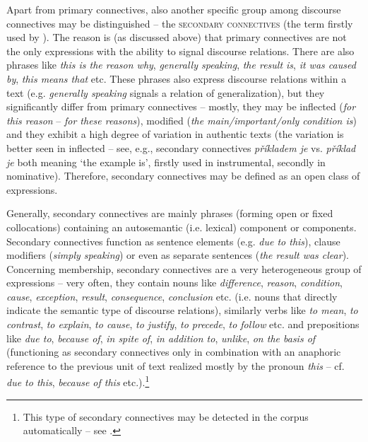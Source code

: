 \documentclass[output=paper]{langsci/langscibook.cls}
\begin{document}
Apart from primary connectives, also another specific group among discourse connectives may be distinguished – the \textsc{secondary connectives} (the term firstly used by \citealt{biblio:RyRyCentreand2014}). The reason is (as discussed above) that primary connectives are not the only expressions with the ability to signal discourse relations. There are also  phrases like \textit{this is the reason why}, \textit{generally speaking}, \textit{the result is}, \textit{it was caused by}, \textit{this means that} etc. These phrases also express discourse relations within a text (e.g. \textit{generally speaking} signals a relation of generalization), but they significantly differ from primary connectives – mostly, they may be inflected (\textit{for this reason} – \textit{for these reasons}), modified (\textit{the main/important/only condition is}) and they exhibit a high degree of variation in authentic texts (the variation is better seen in inflected  – see, e.g., secondary connectives \textit{příkladem je} vs. \textit{příklad je} both meaning `the example is', firstly used in instrumental, secondly in nominative). Therefore, secondary connectives may be defined as an open class of expressions. 


Generally, secondary connectives are mainly  phrases (forming open or fixed collocations) containing an autosemantic (i.e. lexical) component or components. Secondary connectives function as sentence elements (e.g. \textit{due to this}), clause modifiers (\textit{simply speaking}) or even as separate sentences (\textit{the result was clear}). Concerning  membership, secondary connectives are a very heterogeneous group of expressions – very often, they contain nouns like \textit{difference}, \textit{reason}, \textit{condition}, \textit{cause}, \textit{exception}, \textit{result}, \textit{consequence}, \textit{conclusion} etc. (i.e. nouns that directly indicate the semantic type of discourse relations), similarly verbs like \textit{to mean}, \textit{to contrast}, \textit{to explain}, \textit{to cause}, \textit{to justify}, \textit{to precede}, \textit{to follow} etc. and prepositions like \textit{due to}, \textit{because of}, \textit{in spite of}, \textit{in addition to}, \textit{unlike}, \textit{on the basis of} (functioning as secondary connectives only in combination with an anaphoric reference to the previous unit of text realized mostly by the pronoun \textit{this }– cf. \textit{due to this}, \textit{because of this} etc.).\footnote{This type of secondary connectives may be detected in the corpus automatically – see	\citet{biblio:RyMiUseCoreference2014}.}
\end{document}
